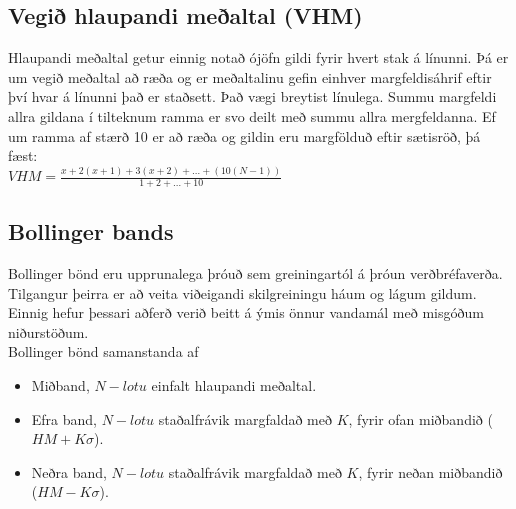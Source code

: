 \documentclass[11pt]{article}
\begin{document}
\subsection{Vegið hlaupandi meðaltal (VHM)}
Hlaupandi meðaltal getur einnig notað ójöfn gildi fyrir hvert stak á línunni.
Þá er um vegið meðaltal að ræða og er meðaltalinu gefin einhver margfeldisáhrif eftir því hvar á línunni það er staðsett. 
Það vægi breytist línulega. Summu margfeldi allra gildana í tilteknum ramma er svo deilt með summu allra mergfeldanna. 
Ef um ramma af stærð 10 er að ræða og gildin eru margfölduð eftir sætisröð, þá fæst: \\
$VHM = \frac{x+2(x+1)+3(x+2)+\dots+(10(N-1))}{1+2+\dots+10}$
\subsection{Bollinger bands}
\label{sec:third}
Bollinger bönd eru upprunalega þróuð sem greiningartól á þróun verðbréfaverða. 
Tilgangur þeirra er að veita viðeigandi skilgreiningu háum og lágum gildum. Einnig hefur þessari aðferð verið beitt á ýmis önnur
vandamál með misgóðum niðurstöðum. \\
Bollinger bönd samanstanda af
\begin{itemize}
  \item Miðband, $N-lotu$ einfalt hlaupandi meðaltal.
  \item Efra band, $N-lotu$ staðalfrávik margfaldað með $K$, fyrir ofan miðbandið ($HM + K\sigma$).
  \item Neðra band, $N-lotu$ staðalfrávik margfaldað með $K$, fyrir neðan miðbandið ($HM - K\sigma$).%
\end{itemize}
\end{document}
